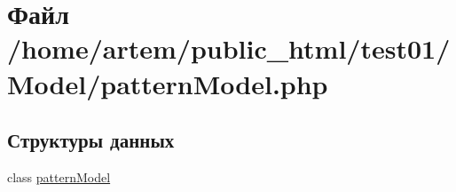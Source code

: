 \hypertarget{pattern_model_8php}{\section{Файл /home/artem/public\-\_\-html/test01/\-Model/pattern\-Model.php}
\label{pattern_model_8php}
}
\subsection*{Структуры данных}
\begin{DoxyCompactItemize}
\item 
class \hyperlink{classpattern_model}{pattern\-Model}
\end{DoxyCompactItemize}
